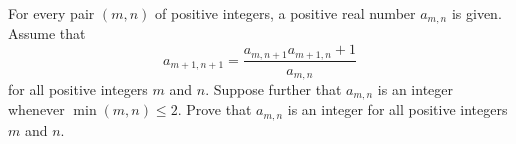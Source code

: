 For every pair $(m, n)$ of positive integers, a positive real number $a_{m, n}$ is given. Assume that \[a_{m+1, n+1} = \frac{a_{m, n+1} a_{m+1, n} + 1}{a_{m, n}}\] for all positive integers $m$ and $n$. Suppose further that $a_{m, n}$ is an integer whenever $\min(m, n) \le 2$. Prove that $a_{m, n}$ is an integer for all positive integers $m$ and $n$.